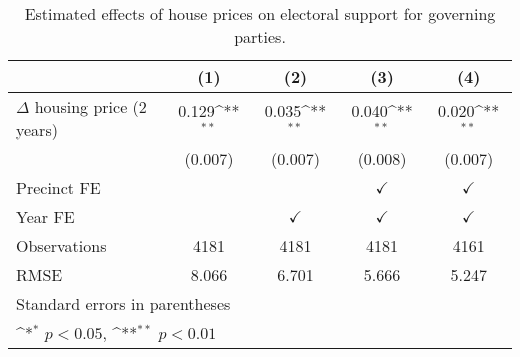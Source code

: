 \begin{table}[htbp]\centering
\def\sym#1{\ifmmode^{#1}\else\(^{#1}\)\fi}
\caption{Estimated effects of house prices on electoral support for governing parties.} \label{prelagiv}
\begin{tabular}{l*{4}{c}}
\hline\hline
                    &\multicolumn{1}{c}{(1)}        &\multicolumn{1}{c}{(2)}        &\multicolumn{1}{c}{(3)}        &\multicolumn{1}{c}{(4)}        \\
\hline
$\Delta$ housing price (2 years)&       0.129\sym{**}&       0.035\sym{**}&       0.040\sym{**}&       0.020\sym{**}\\
                    &     (0.007)        &     (0.007)        &     (0.008)        &     (0.007)        \\
[1em]
\hline Precinct FE  &                    &                    &$\checkmark$        &$\checkmark$        \\
[1em]
Year FE             &                    &$\checkmark$        &$\checkmark$        &$\checkmark$        \\
\hline
Observations        &        4181        &        4181        &        4181        &        4161        \\
RMSE                &       8.066        &       6.701        &       5.666        &       5.247        \\
\hline\hline
\multicolumn{5}{l}{\footnotesize Standard errors in parentheses}\\
\multicolumn{5}{l}{\footnotesize \sym{*} \(p<0.05\), \sym{**} \(p<0.01\)}\\
\end{tabular}
\end{table}
